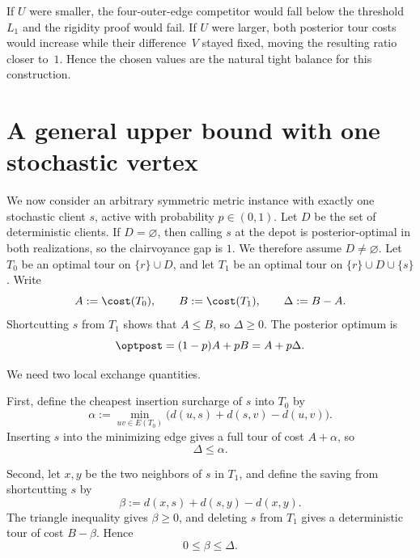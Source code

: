 If $U$ were smaller, the four-outer-edge competitor would fall below the
threshold~$L_1$ and the rigidity proof would fail.  If $U$ were larger, both
posterior tour costs would increase while their difference~$V$ stayed fixed,
moving the resulting ratio closer to~$1$.  Hence the chosen values are the
natural tight balance for this construction.

\section{A general upper bound with one stochastic vertex}

We now consider an arbitrary symmetric metric instance with exactly one
stochastic client $s$, active with probability $p\in(0,1)$.  Let $D$ be the
set of deterministic clients.  If $D=\varnothing$, then calling $s$ at the
depot is posterior-optimal in both realizations, so the clairvoyance gap is
$1$.  We therefore assume $D\ne\varnothing$.  Let $T_0$ be an optimal tour on
$\{r\}\cup D$, and let $T_1$ be an optimal tour on
$\{r\}\cup D\cup\{s\}$.  Write
\[
  A:=\cost(T_0),
  \qquad
  B:=\cost(T_1),
  \qquad
  \Delta:=B-A.
\]
Shortcutting $s$ from $T_1$ shows that $A\le B$, so $\Delta\ge0$.  The
posterior optimum is
\begin{equation}\label{eq:post-general}
  \optpost=(1-p)A+pB=A+p\Delta.
\end{equation}

We need two local exchange quantities.

First, define the cheapest insertion surcharge of $s$ into $T_0$ by
\begin{equation}\label{eq:alpha}
  \alpha
  :=\min_{uv\in E(T_0)}
  \bigl(d(u,s)+d(s,v)-d(u,v)\bigr).
\end{equation}
Inserting $s$ into the minimizing edge gives a full tour of cost $A+\alpha$,
so
\begin{equation}\label{eq:delta-alpha}
  \Delta\le\alpha.
\end{equation}

Second, let $x,y$ be the two neighbors of $s$ in $T_1$, and define the saving
from shortcutting $s$ by
\begin{equation}\label{eq:beta}
  \beta:=d(x,s)+d(s,y)-d(x,y).
\end{equation}
The triangle inequality gives $\beta\ge0$, and deleting $s$ from $T_1$ gives
a deterministic tour of cost $B-\beta$.  Hence
\begin{equation}\label{eq:beta-delta}
  0\le\beta\le\Delta.
\end{equation}

